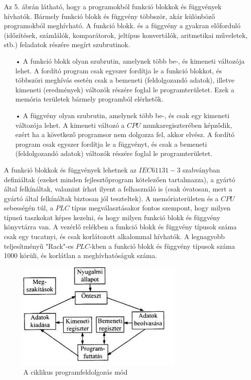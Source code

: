 \documentclass[11pt,a4paper]{article}
\begin{document}
Az 5. ábrán látható, hogy a programokból funkció blokkok és függvények hívhatók. Bármely funkció blokk és függvény többször, akár különböző programokból meghívható. A funkció blokk. és a függvény a gyakran előforduló (időzítések, számlálók, komparátorok, jeltípus konvertálók, aritmetikai műveletek, stb.) feladatok részére megírt szubrutinok.
\begin{enumerate}
	\item[•]A funkció blokk olyan szubrutin, amelynek több be-, és kimeneti változója lehet. A fordító program csak egyszer fordítja le a funkció blokkot, és  többszöri meghívás esetén csak a bemeneti (feldolgozandó adatok), illetve kimeneti (eredmények) változók részére foglal le programterületet. Ezek a memória területek bármely programból elérhetők.
	\item[•]A függvény olyan szubrutin, amelynek több be-, és csak egy kimeneti változója lehet. A kimeneti változó a $CPU$ munkaregiszterében képződik, ezért ha a következő programsor nem dolgozza fel, akkor elvész. A fordító program csak egyszer fordítja le a függvényt, és csak a bemeneti (feldolgozandó adatok) változók részére foglal le programterületet.
\end{enumerate}
A funkció blokkok és függvények lehetnek az $IEC61 131-3$ szabványban definiáltak (ezeket minden fejlesztőprogram kötelezően tartalmazza), a gyártó által felkínáltak, valamint írhat ilyent a felhasználó is (csak óvatosan, mert a gyártó által felkínáltak biztosan jól teszteltek).
A memóriaterületen és a $CPU$ sebességén túl, a $PLC$ típus megválasztásakor fontos szempont, hogy milyen típusú taszkokat képes kezelni, és hogy milyen funkció blokk és függvény könyvtárra van.
A vezérlő relékben a funkció blokk és függvény típusok száma csak egy  tucatnyi, és csak korlátozott alkalommal hívhatók. A legnagyobb teljesítményű   "Rack"-es $PLC$-kben a funkció blokk és függvény típusok száma 1000 körüli,  és korlátlan a meghívhatóságuk száma.
\begin{figure}[hbtp]
    	 \centering
		\includegraphics[scale=0.7]{7_ciklikus_plc.png}
		\caption{A ciklikus programfeldolgozás mód}
\end{figure}
\end{document}
